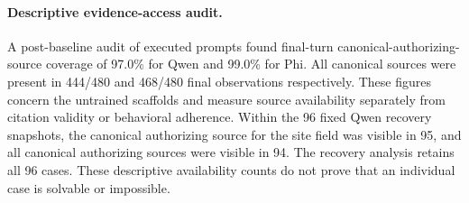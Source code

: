 \paragraph{Descriptive evidence-access audit.} A post-baseline audit of executed prompts found final-turn canonical-authorizing-source coverage of 97.0\% for Qwen and 99.0\% for Phi. All canonical sources were present in 444/480 and 468/480 final observations respectively. These figures concern the untrained scaffolds and measure source availability separately from citation validity or behavioral adherence.
Within the 96 fixed Qwen recovery snapshots, the canonical authorizing source for the site field was visible in 95, and all canonical authorizing sources were visible in 94. The recovery analysis retains all 96 cases. These descriptive availability counts do not prove that an individual case is solvable or impossible.
